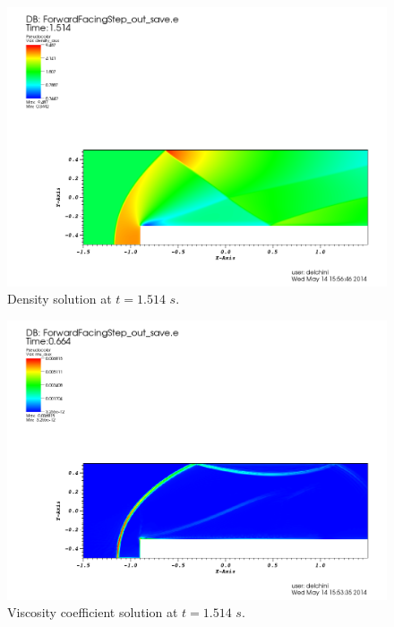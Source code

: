\begin{figure}[H]
\centering
\includegraphics[scale=.50]{figures/FFSDensityEqualTo1p514.png}
\caption{Density solution at $t=1.514$ $s$.}
\label{fig:2d_ffs_rho_1514}
\end{figure}
%
\begin{figure}[H]
\centering
\includegraphics[scale=.50]{figures/FFSViscEqualTo0p664.png}
\caption{Viscosity coefficient solution at $t=1.514$ $s$.}
\label{fig:2d_ffs_visc_1514}
\end{figure}
%
